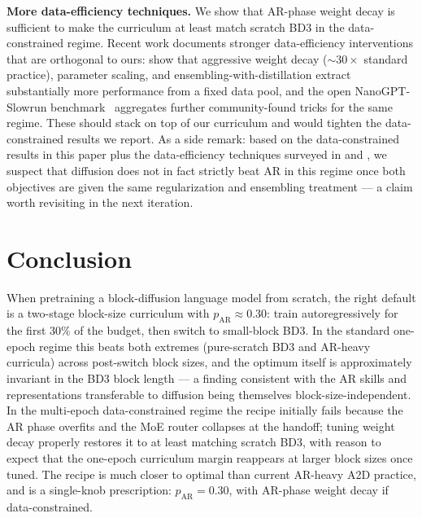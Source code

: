 \documentclass{article}
\newcommand{\pAR}{p_{\mathrm{AR}}}
\begin{document}
\textbf{More data-efficiency techniques.} We show that AR-phase weight decay is sufficient to make the curriculum at least match scratch BD3 in the data-constrained regime. Recent work documents stronger data-efficiency interventions that are orthogonal to ours: \citet{kim2025infinitecompute} show that aggressive weight decay (${\sim}30\times$ standard practice), parameter scaling, and ensembling-with-distillation extract substantially more performance from a fixed data pool, and the open NanoGPT-Slowrun benchmark~\citep{nanogpt_slowrun} aggregates further community-found tricks for the same regime. These should stack on top of our curriculum and would tighten the data-constrained results we report. As a side remark: based on the data-constrained results in this paper plus the data-efficiency techniques surveyed in \citet{kim2025infinitecompute} and \citep{nanogpt_slowrun}, we suspect that diffusion does not in fact strictly beat AR in this regime once both objectives are given the same regularization and ensembling treatment --- a claim worth revisiting in the next iteration.

\section{Conclusion}
\label{sec:conclusion}

When pretraining a block-diffusion language model from scratch, the right default is a two-stage block-size curriculum with $\pAR \approx 0.30$: train autoregressively for the first $30\%$ of the budget, then switch to small-block BD3. In the standard one-epoch regime this beats both extremes (pure-scratch BD3 and AR-heavy curricula) across post-switch block sizes, and the optimum itself is approximately invariant in the BD3 block length --- a finding consistent with the AR skills and representations transferable to diffusion being themselves block-size-independent. In the multi-epoch data-constrained regime the recipe initially fails because the AR phase overfits and the MoE router collapses at the handoff; tuning weight decay properly restores it to at least matching scratch BD3, with reason to expect that the one-epoch curriculum margin reappears at larger block sizes once tuned. The recipe is much closer to optimal than current AR-heavy A2D practice, and is a single-knob prescription: $\pAR{=}0.30$, with AR-phase weight decay if data-constrained.
\end{document}
